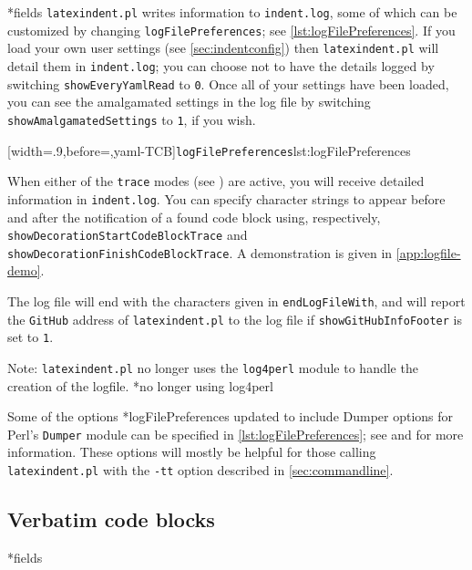 *{fields}
	\texttt{latexindent.pl} writes information to \texttt{indent.log}, some
	of which can be customized by changing \texttt{logFilePreferences}; see
	\cref{lst:logFilePreferences}. If you load your own user settings (see
	\vref{sec:indentconfig}) then \texttt{latexindent.pl} will detail them in
	\texttt{indent.log}; you can choose not to have the details logged by switching
	\texttt{showEveryYamlRead} to \texttt{0}. Once all of your settings have been loaded, you
	can see the amalgamated settings in the log file by switching
	\texttt{showAmalgamatedSettings} to \texttt{1}, if you wish.

	[width=.9\linewidth,before=\centering,yaml-TCB]{\texttt{logFilePreferences}}{lst:logFilePreferences}

	When%
	 either of
	the \texttt{trace} modes (see ) are active, you will receive
	detailed information in \texttt{indent.log}. You can specify character strings to appear
	before and after the notification of a found code block using, respectively,
	\texttt{showDecorationStartCodeBlockTrace} and
	\texttt{showDecorationFinishCodeBlockTrace}. A demonstration is given in
	\vref{app:logfile-demo}.

	The log file will end with the characters given in \texttt{endLogFileWith}, and will
	report the \texttt{GitHub} address of \texttt{latexindent.pl} to the log file if
	\texttt{showGitHubInfoFooter} is set to \texttt{1}.

	Note: \texttt{latexindent.pl} no longer uses the \texttt{log4perl} module to handle the
	creation of the logfile.%
	*{no longer using log4perl}

	Some of the options%
	*{logFilePreferences updated to include Dumper options} for Perl's
	\texttt{Dumper} module can be specified in \cref{lst:logFilePreferences}; see
	\cite{dumper} and \cite{dumperdemo} for more information. These options will mostly be
	helpful for those calling \texttt{latexindent.pl} with the \texttt{-tt} option described
	in \cref{sec:commandline}.

\subsection{Verbatim code blocks}
*{fields}

